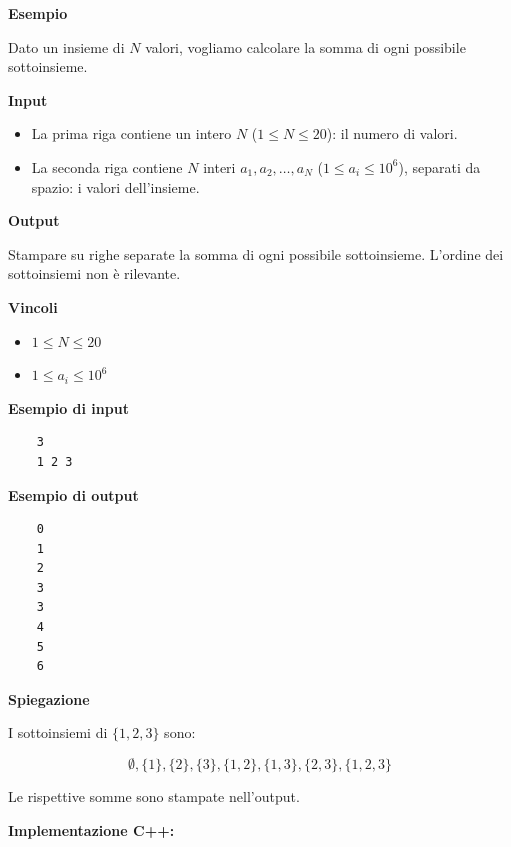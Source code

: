 \bigskip
\noindent \textbf{Esempio}

Dato un insieme di \( N \) valori, vogliamo calcolare la somma di ogni possibile sottoinsieme.

\bigskip
\noindent \textbf{Input}

\begin{itemize}
	\item La prima riga contiene un intero \( N \) (\(1 \le N \le 20\)): il numero di valori.
	\item La seconda riga contiene \( N \) interi \( a_1, a_2, \dots, a_N \) (\(1 \le a_i \le 10^6\)), separati da spazio: i valori dell’insieme.
\end{itemize}

\bigskip
\noindent \textbf{Output}

Stampare su righe separate la somma di ogni possibile sottoinsieme. L’ordine dei sottoinsiemi non è rilevante.

\bigskip
\noindent \textbf{Vincoli}
\begin{itemize}
	\item $1 \le N \le 20$
	\item $1 \le a_i \le 10^6$
\end{itemize}



\bigskip
\noindent \textbf{Esempio di input}

\begin{verbatim}
	3
	1 2 3
\end{verbatim}


\noindent \textbf{Esempio di output}

\begin{verbatim}
	0
	1
	2
	3
	3
	4
	5
	6
\end{verbatim}

\noindent \textbf{Spiegazione}

I sottoinsiemi di \(\{1,2,3\}\) sono:

\[
\emptyset, \{1\}, \{2\}, \{3\}, \{1,2\}, \{1,3\}, \{2,3\}, \{1,2,3\}
\]

Le rispettive somme sono stampate nell’output.


\bigskip \textbf{Implementazione C++:}

